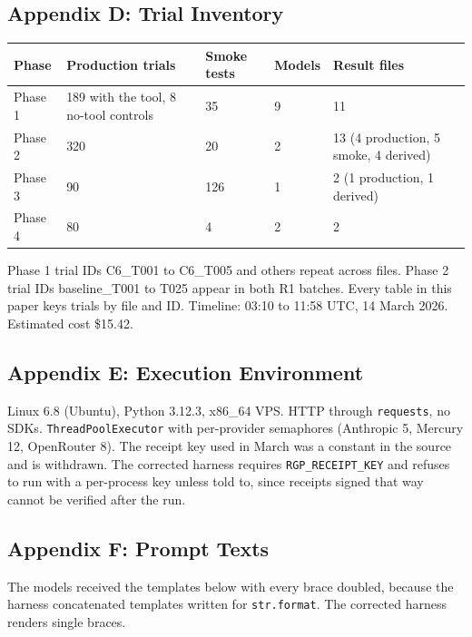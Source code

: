 \documentclass[
]{article}
\newcounter{none} %
\begin{document}
\subsection{Appendix D: Trial
Inventory}\label{appendix-d-trial-inventory}

{\def\LTcaptype{none} %
\begin{longtable}[]{@{}lllll@{}}
\toprule\noalign{}
Phase & Production trials & Smoke tests & Models & Result files \\
\midrule\noalign{}
\endhead
\bottomrule\noalign{}
\endlastfoot
Phase 1 & 189 with the tool, 8 no-tool controls & 35 & 9 & 11 \\
Phase 2 & 320 & 20 & 2 & 13 (4 production, 5 smoke, 4 derived) \\
Phase 3 & 90 & 126 & 1 & 2 (1 production, 1 derived) \\
Phase 4 & 80 & 4 & 2 & 2 \\
\end{longtable}
}

Phase 1 trial IDs C6\_T001 to C6\_T005 and others repeat across files.
Phase 2 trial IDs baseline\_T001 to T025 appear in both R1 batches.
Every table in this paper keys trials by file and ID. Timeline: 03:10 to
11:58 UTC, 14 March 2026. Estimated cost \$15.42.

\subsection{Appendix E: Execution
Environment}\label{appendix-e-execution-environment}

Linux 6.8 (Ubuntu), Python 3.12.3, x86\_64 VPS. HTTP through
\texttt{requests}, no SDKs. \texttt{ThreadPoolExecutor} with
per-provider semaphores (Anthropic 5, Mercury 12, OpenRouter 8). The
receipt key used in March was a constant in the source and is withdrawn.
The corrected harness requires \texttt{RGP\_RECEIPT\_KEY} and refuses to
run with a per-process key unless told to, since receipts signed that
way cannot be verified after the run.

\subsection{Appendix F: Prompt Texts}\label{appendix-f-prompt-texts}

The models received the templates below with every brace doubled,
because the harness concatenated templates written for
\texttt{str.format}. The corrected harness renders single braces.
\end{document}
